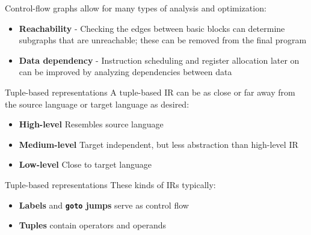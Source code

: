 \documentclass[../index.tex]{subfiles}
\begin{document}
\begin{frame}[fragile]{\currenttitle}
  Control-flow graphs allow for many types of analysis and optimization:

  \begin{itemize}
    \item \textbf{Reachability} - Checking the edges between basic blocks can
      determine subgraphs that are unreachable; these can be removed from the
      final program
    \item \textbf{Data dependency} - Instruction scheduling and register
      allocation later on can be improved by analyzing dependencies between
      data
  \end{itemize}
\end{frame}
  
\renewcommand{\currenttitle}{Tuple-based representations}
\begin{frame}[fragile]{\currenttitle}
  A tuple-based IR can be as close or far away from the source language or
  target language as desired:

  \begin{itemize}
    \item \textbf{High-level} \textendash{} Resembles source language
    \item \textbf{Medium-level} \textendash{} Target independent, but less
      abstraction than high-level IR
    \item \textbf{Low-level} \textendash{} Close to target language
  \end{itemize}
\end{frame}

\begin{frame}[fragile]{\currenttitle}
  These kinds of IRs typically:

  \begin{itemize}
    \item \textbf{Labels} and \textbf{\texttt{goto} jumps} serve as control flow
    \item \textbf{Tuples} contain operators and operands
  \end{itemize}
\end{frame}
  
\end{document}
